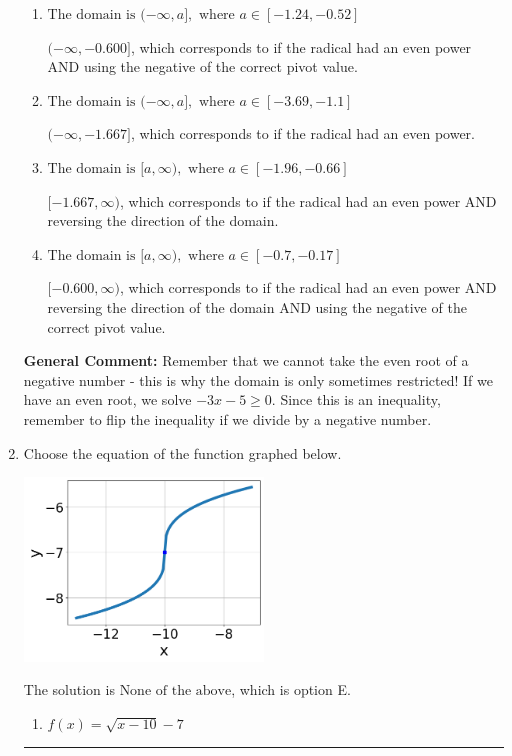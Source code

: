 \documentclass{extbook}[14pt]
\newcommand{\litem}[1]{\item #1

\rule{\textwidth}{0.4pt}}
\begin{document}
\begin{enumerate}
{\begin{enumerate}[label=\Alph*.]
* This is the correct option since the radical has an odd power.
\item \( \text{The domain is } (-\infty, a], \text{   where } a \in [-1.24, -0.52] \)

$(-\infty, -0.600]$, which corresponds to if the radical had an even power AND using the negative of the correct pivot value.
\item \( \text{The domain is } (-\infty, a], \text{   where } a \in [-3.69, -1.1] \)

$(-\infty, -1.667]$, which corresponds to if the radical had an even power.
\item \( \text{The domain is } [a, \infty), \text{   where } a \in [-1.96, -0.66] \)

$[-1.667, \infty)$, which corresponds to if the radical had an even power AND reversing the direction of the domain.
\item \( \text{The domain is } [a, \infty), \text{   where } a \in [-0.7, -0.17] \)

$[-0.600, \infty)$, which corresponds to if the radical had an even power AND reversing the direction of the domain AND using the negative of the correct pivot value.
\end{enumerate}

\textbf{General Comment:} Remember that we cannot take the even root of a negative number - this is why the domain is only sometimes restricted! If we have an even root, we solve $-3 x - 5 \geq 0$. Since this is an inequality, remember to flip the inequality if we divide by a negative number.
}
\litem{
Choose the equation of the function graphed below.

\begin{center}
    \includegraphics[width=0.5\textwidth]{../Figures/radicalGraphToEquationA.png}
\end{center}



The solution is \( \text{None of the above} \), which is option E.\begin{enumerate}[label=\Alph*.]
\item \( f(x) = \sqrt{x - 10} - 7 \)


\end{enumerate}}
\end{enumerate}
\end{document}

